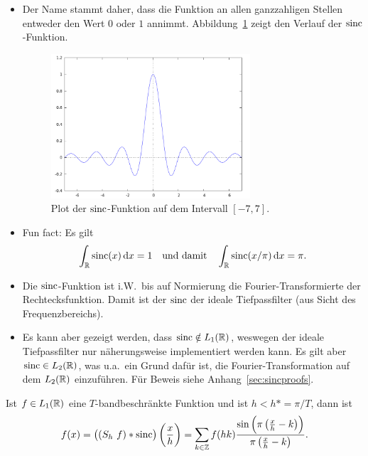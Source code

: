 \begin{remark}\leavevmode
\begin{itemize}
\item Der Name stammt daher, dass die Funktion an allen ganzzahligen Stellen entweder den Wert 
  $ 0 $ oder $ 1 $ annimmt. Abbildung~\ref{fig:sinc} zeigt den Verlauf der $ \operatorname{sinc} $-Funktion.
  \begin{figure}[ht]
  \centering
  \includegraphics[width=0.7\textwidth]{Bilder/sinc}
  \caption{Plot der $ \operatorname{sinc} $-Funktion auf dem Intervall $ [-7,7] $.}
  \label{fig:sinc}
  \end{figure}
\item Fun fact: Es gilt
  \[
    \int_{\R} \sinc(x) \dif x = 1 \quad \text{und damit} \quad
    \int_{\R} \sinc(x / \pi) \dif x = \pi.
  \]
\item Die $ \operatorname{sinc} $-Funktion ist i.W.\ bis auf Normierung die Fourier-Transformierte der
  Rechtecksfunktion. Damit ist der $ \operatorname{sinc} $ der ideale Tiefpassfilter (aus Sicht des
  Frequenzbereichs).
\item Es kann aber gezeigt werden, dass $ \operatorname{sinc} \notin L_{1}(\mathbb{R}) $, weswegen der ideale 
  Tiefpassfilter nur näherungsweise implementiert werden kann. Es gilt aber
  $ \operatorname{sinc} \in L_{2}(\mathbb{R}) $, was u.a.\ ein Grund dafür ist, die Fourier-Transformation auf dem
  $ L_{2}(\mathbb{R}) $ einzuführen. Für Beweis siehe Anhang~\ref{sec:sincproofs}.
\end{itemize}
\end{remark}

\begin{proposition}
Ist $ f \in L_{1}(\mathbb{R}) $ eine $ T $-bandbeschränkte Funktion und ist $ h < h* = \pi / T $, dann ist
\[
  f(x) = \left( (S_{h} \ f) * \operatorname{sinc} \right) \left( \frac{x}{h} \right) 
       = \sum_{k \in \mathbb{Z}} f(hk) 
           \frac{\sin \left( \pi \left( \frac{x}{h} - k \right) \right)}
                {\pi \left( \frac{x}{h} - k \right)}.
\]
\end{proposition}

